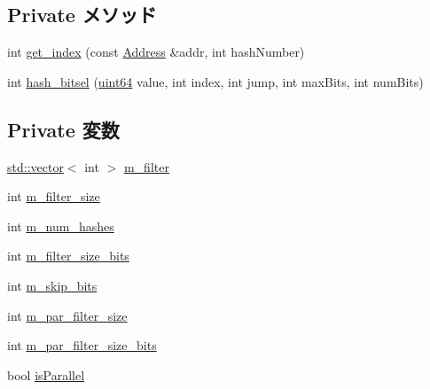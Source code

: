\subsection*{Private メソッド}
\begin{DoxyCompactItemize}
\item 
int \hyperlink{classMultiBitSelBloomFilter_a4e668c45847b52c4595b4c5c5f7fd8d0}{get\_\-index} (const \hyperlink{classAddress}{Address} \&addr, int hashNumber)
\item 
int \hyperlink{classMultiBitSelBloomFilter_a165665b101146ec0bf551d29a11b99a2}{hash\_\-bitsel} (\hyperlink{TypeDefines_8hh_a29940ae63ec06c9998bba873e25407ad}{uint64} value, int index, int jump, int maxBits, int numBits)
\end{DoxyCompactItemize}
\subsection*{Private 変数}
\begin{DoxyCompactItemize}
\item 
\hyperlink{classstd_1_1vector}{std::vector}$<$ int $>$ \hyperlink{classMultiBitSelBloomFilter_aae3fd71ce4b5e8910aa63829ba6abd41}{m\_\-filter}
\item 
int \hyperlink{classMultiBitSelBloomFilter_af53abddc4707ab403450239a6e94c486}{m\_\-filter\_\-size}
\item 
int \hyperlink{classMultiBitSelBloomFilter_af7541b7da6a403e38b057b6a87b45be5}{m\_\-num\_\-hashes}
\item 
int \hyperlink{classMultiBitSelBloomFilter_a5c26703945ae76ff80ec6951cccea29c}{m\_\-filter\_\-size\_\-bits}
\item 
int \hyperlink{classMultiBitSelBloomFilter_afc5025302ea7b713275556573dfc7472}{m\_\-skip\_\-bits}
\item 
int \hyperlink{classMultiBitSelBloomFilter_ac7811fb42f6c367903485a7c0c686d28}{m\_\-par\_\-filter\_\-size}
\item 
int \hyperlink{classMultiBitSelBloomFilter_a3d9d1bb83f31a4494f3247207e98cabd}{m\_\-par\_\-filter\_\-size\_\-bits}
\item 
bool \hyperlink{classMultiBitSelBloomFilter_ae60d0e7ab765c8e6b2155c6841da8875}{isParallel}
\end{DoxyCompactItemize}


